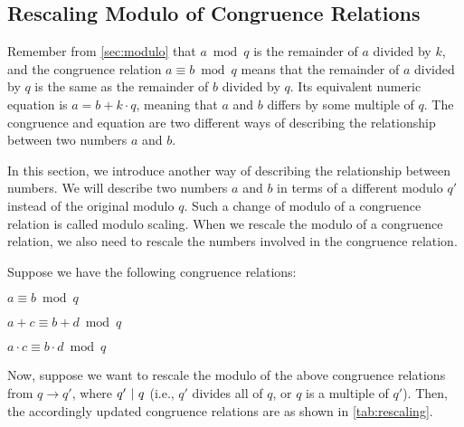 
\subsection{Rescaling Modulo of Congruence Relations}
\label{subsec:modulo-rescaling}

Remember from \autoref{sec:modulo} that $a \bmod q$ is the remainder of $a$ divided by $k$, and the congruence relation $a \equiv b \bmod q$ means that the remainder of $a$ divided by $q$ is the same as the remainder of $b$ divided by $q$. Its equivalent numeric equation is  $a = b + k\cdot q$, meaning that $a$ and $b$ differs by some multiple of $q$. The congruence and equation are two different ways of describing the relationship between two numbers $a$ and $b$. 

In this section, we introduce another way of describing the relationship between numbers. We will describe two numbers $a$ and $b$ in terms of a different modulo $q'$ instead of the original modulo $q$. Such a change of modulo of a congruence relation is called modulo scaling. When we rescale the modulo of a congruence relation, we also need to rescale the numbers involved in the congruence relation. 

Suppose we have the following congruence relations: 

$a \equiv b \bmod q$

$a + c \equiv b + d\bmod q$

$a \cdot c \equiv b \cdot d\bmod q$

Now, suppose we want to rescale the modulo of the above congruence relations from $q \rightarrow q'$, where $q' \text{ } \text{$|$} \text{ } q$ (i.e., $q'$ divides all of $q$, or $q$ is a multiple of $q'$). Then, the accordingly updated congruence relations are as shown in \autoref{tab:rescaling}.



